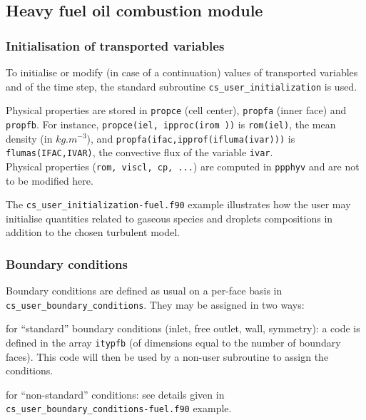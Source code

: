 {{%
\subsection{Heavy fuel oil combustion module}
\subsubsection{Initialisation of transported variables}
To initialise or modify (in case of a continuation) values of transported
variables and of the time step, the standard subroutine \texttt{cs\_user\_initialization} is used.

Physical properties are stored in \texttt{propce} (cell center), \texttt{propfa} (inner face) and \texttt{propfb}. For instance, \texttt{propce(iel, ipproc(irom  ))} is \texttt{rom(iel)}, the mean density (in $kg.m^{-3}$), and \texttt{propfa(ifac,ipprof(ifluma(ivar)))} is \texttt{flumas(IFAC,IVAR)}, the convective flux of the variable \texttt{ivar}.\\
Physical properties (\texttt{rom, viscl, cp, ...}) are computed in \texttt{ppphyv} and are not to be modified here.

The \texttt{cs\_user\_initialization-fuel.f90} example illustrates how the user
may initialise quantities related to gaseous species and droplets compositions
in addition to the chosen turbulent model.

\subsubsection{Boundary conditions}
Boundary conditions are defined as usual on a per-face basis in
\texttt{cs\_user\_boundary\_conditions}. They may be assigned in two ways:
\begin{list}{.}{}
\item for ``standard'' boundary conditions (inlet, free outlet, wall, symmetry): a code is defined in the array \texttt{itypfb} (of dimensions equal to the number of boundary faces). This code will then be used by a non-user subroutine to assign the conditions.
\item for ``non-standard'' conditions: see details given in
  \texttt{cs\_user\_boundary\_conditions-fuel.f90} example.
\end{list}

}}

